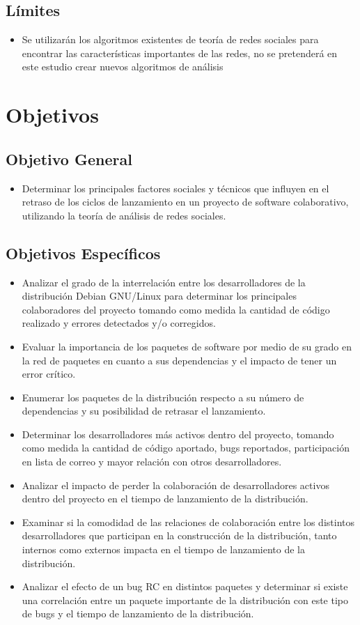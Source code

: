 \documentclass[letterpaper,12pt,titlepage]{report}
\begin{document}
\section*{Límites}
\begin{itemize}
\item Se utilizarán los algoritmos existentes de teoría de redes
  sociales para encontrar las características importantes de las
  redes, no se pretenderá en este estudio crear nuevos algoritmos de
  análisis
\end{itemize}

\chapter{Objetivos}
\section*{Objetivo General}
\begin{itemize}
\item Determinar los principales factores sociales y técnicos que
  influyen en el retraso de los ciclos de lanzamiento en un proyecto
  de software colaborativo, utilizando la teoría de análisis de redes
  sociales.
\end{itemize}

\section*{Objetivos Específicos}
\begin{itemize}
\item Analizar el grado de la interrelación entre los desarrolladores
  de la distribución Debian GNU/Linux para determinar los principales
  colaboradores del proyecto tomando como medida la cantidad de código
  realizado y errores detectados y/o corregidos.
\item Evaluar la importancia de los paquetes de software por medio de
  su grado en la red de paquetes en cuanto a sus dependencias y el
  impacto de tener un error crítico.
\item Enumerar los paquetes de la distribución respecto a su número de
  dependencias y su posibilidad de retrasar el lanzamiento.
\item Determinar los desarrolladores más activos dentro del proyecto,
  tomando como medida la cantidad de código aportado, bugs reportados,
  participación en lista de correo y mayor relación con otros
  desarrolladores.
\item Analizar el impacto de perder la colaboración de desarrolladores
  activos dentro del proyecto en el tiempo de lanzamiento de la
  distribución.
\item Examinar si la comodidad de las relaciones de colaboración entre
  los distintos desarrolladores que participan en la construcción de
  la distribución, tanto internos como externos impacta en el tiempo
  de lanzamiento de la distribución.
\item Analizar el efecto de un bug RC en distintos paquetes y
  determinar si existe una correlación entre un paquete importante de
  la distribución con este tipo de bugs y el tiempo de lanzamiento de
  la distribución.
\end{itemize}
\end{document}
